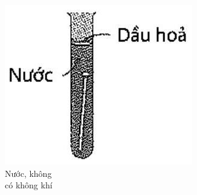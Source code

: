 \documentclass[10pt]{article}
\begin{document}
\begin{figure}[h]
\begin{center}
  \includegraphics[width=\textwidth]{2025_10_23_74efce88ce3a451fd6b0g-072(1)}
\captionsetup{labelformat=empty}
\caption{Nước, không\\
có không khí}
\end{center}
\end{figure}
\end{document}
